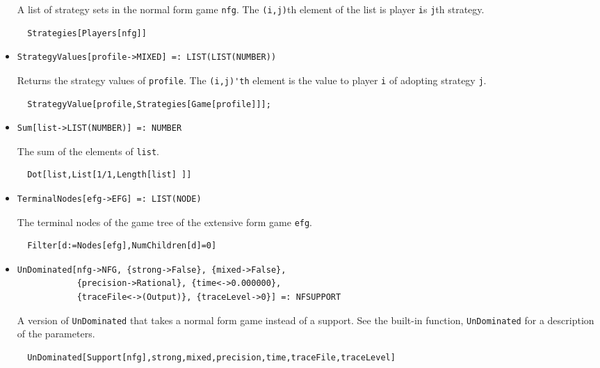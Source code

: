 \begin{itemize}
\bd 
A list of strategy sets in the normal form game \verb+nfg+. The
\verb+(i,j)+th element of the list is player \verb+i+s \verb+j+th
strategy.  
\begin{verbatim}
  Strategies[Players[nfg]]
\end{verbatim} 
\ed

\item{}
\protect \large \begin{verbatim}
StrategyValues[profile->MIXED] =: LIST(LIST(NUMBER)) 
\end{verbatim}\normalsize

\bd 
Returns the strategy values of \verb+profile+.  The
\verb+(i,j)'th+ element is the value to player \verb+i+ of adopting
strategy \verb+j+. 
\begin{verbatim}
  StrategyValue[profile,Strategies[Game[profile]]];
\end{verbatim} 
\ed

\item{}
\protect \large \begin{verbatim}
Sum[list->LIST(NUMBER)] =: NUMBER 
\end{verbatim}\normalsize

\bd 
The sum of the elements of \verb+list+.  
\begin{verbatim}
  Dot[list,List[1/1,Length[list] ]]
\end{verbatim} 
\ed



\item{}
\protect \large \begin{verbatim}
TerminalNodes[efg->EFG] =: LIST(NODE) 
\end{verbatim}\normalsize

\bd 
The terminal nodes of the game tree of the extensive form game \verb+efg+.
\begin{verbatim}
  Filter[d:=Nodes[efg],NumChildren[d]=0]
\end{verbatim} 
\ed


\item{}
\protect \large \begin{verbatim}
UnDominated[nfg->NFG, {strong->False}, {mixed->False}, 
            {precision->Rational}, {time<->0.000000}, 
            {traceFile<->(Output)}, {traceLevel->0}] =: NFSUPPORT 
\end{verbatim}\normalsize

\bd 
A version of \verb+UnDominated+ that takes a normal form game instead
of a support.  See the built-in function, \verb+UnDominated+ for a
description of the parameters.
\begin{verbatim}
  UnDominated[Support[nfg],strong,mixed,precision,time,traceFile,traceLevel]
\end{verbatim} 
\ed


\end{itemize}
